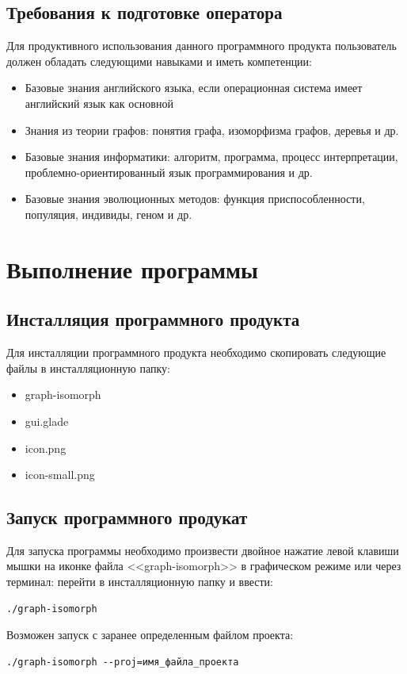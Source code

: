 \documentclass[russian,utf8,emptystyle]{eskdtext}
\begin{document}
\subsection{Требования к подготовке оператора}
Для продуктивного использования данного программного продукта пользователь должен обладать следующими навыками и иметь компетенции:
\begin{itemize}
\item Базовые знания английского языка, если операционная система имеет английский язык как основной
\item Знания из теории графов: понятия графа, изоморфизма графов, деревья и др.
\item Базовые знания информатики: алгоритм, программа, процесс интерпретации, проблемно-ориентированный язык программирования и др.
\item Базовые знания эволюционных методов: функция приспособленности, популяция, индивиды, геном и др.
\end{itemize}

\section{Выполнение программы}
\subsection{Инсталляция программного продукта}
Для инсталляции программного продукта необходимо скопировать следующие файлы в инсталляционную папку:
\begin{itemize}
\item graph-isomorph
\item gui.glade
\item icon.png
\item icon-small.png
\end{itemize}

\subsection{Запуск программного продукат}
Для запуска программы необходимо произвести двойное нажатие левой клавиши мышки на иконке файла <<graph-isomorph>> в графическом режиме или через терминал: перейти в инсталляционную папку и ввести:
\begin{verbatim}
./graph-isomorph
\end{verbatim} 

Возможен запуск с заранее определенным файлом проекта: 
\begin{verbatim}
./graph-isomorph --proj=имя_файла_проекта
\end{verbatim}
\end{document}
